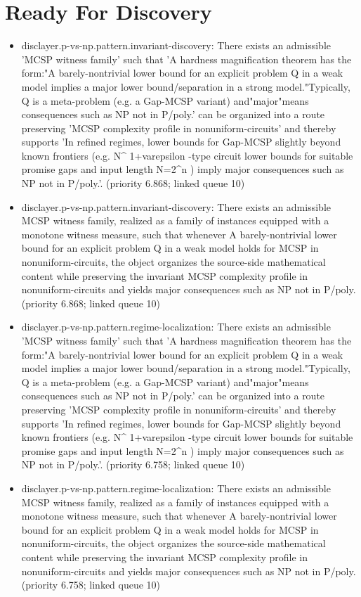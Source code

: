 \documentclass[11pt]{article}
\begin{document}
\section*{Ready For Discovery}
\begin{itemize}
\item disclayer.p-vs-np.pattern.invariant-discovery: There exists an admissible 'MCSP witness family' such that 'A hardness magnification theorem has the form:"A barely-nontrivial lower bound for an explicit problem Q in a weak model implies a major lower bound/separation in a strong model."Typically, Q is a meta-problem (e.g. a Gap-MCSP variant) and"major"means consequences such as NP not in P/poly.' can be organized into a route preserving 'MCSP complexity profile in nonuniform-circuits' and thereby supports 'In refined regimes, lower bounds for Gap-MCSP slightly beyond known frontiers (e.g. N\textasciicircum{} 1+varepsilon -type circuit lower bounds for suitable promise gaps and input length N=2\textasciicircum{}n ) imply major consequences such as NP not in P/poly.'. (priority 6.868; linked queue 10)
\item disclayer.p-vs-np.pattern.invariant-discovery: There exists an admissible MCSP witness family, realized as a family of instances equipped with a monotone witness measure, such that whenever A barely-nontrivial lower bound for an explicit problem Q in a weak model holds for MCSP in nonuniform-circuits, the object organizes the source-side mathematical content while preserving the invariant MCSP complexity profile in nonuniform-circuits and yields major consequences such as NP not in P/poly. (priority 6.868; linked queue 10)
\item disclayer.p-vs-np.pattern.regime-localization: There exists an admissible 'MCSP witness family' such that 'A hardness magnification theorem has the form:"A barely-nontrivial lower bound for an explicit problem Q in a weak model implies a major lower bound/separation in a strong model."Typically, Q is a meta-problem (e.g. a Gap-MCSP variant) and"major"means consequences such as NP not in P/poly.' can be organized into a route preserving 'MCSP complexity profile in nonuniform-circuits' and thereby supports 'In refined regimes, lower bounds for Gap-MCSP slightly beyond known frontiers (e.g. N\textasciicircum{} 1+varepsilon -type circuit lower bounds for suitable promise gaps and input length N=2\textasciicircum{}n ) imply major consequences such as NP not in P/poly.'. (priority 6.758; linked queue 10)
\item disclayer.p-vs-np.pattern.regime-localization: There exists an admissible MCSP witness family, realized as a family of instances equipped with a monotone witness measure, such that whenever A barely-nontrivial lower bound for an explicit problem Q in a weak model holds for MCSP in nonuniform-circuits, the object organizes the source-side mathematical content while preserving the invariant MCSP complexity profile in nonuniform-circuits and yields major consequences such as NP not in P/poly. (priority 6.758; linked queue 10)

\end{itemize}
\end{document}
